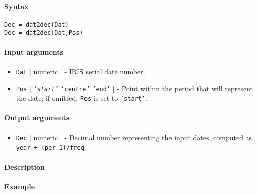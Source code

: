 


	\paragraph{Syntax}\label{syntax}

\begin{verbatim}
Dec = dat2dec(Dat)
Dec = dat2dec(Dat,Pos)
\end{verbatim}

\paragraph{Input arguments}\label{input-arguments}

\begin{itemize}
\item
  \texttt{Dat} {[} numeric {]} - IRIS serial date number.
\item
  \texttt{Pos} {[} \emph{\texttt{'start'}} \textbar{} \texttt{'centre'}
  \textbar{} \texttt{'end'} {]} - Point within the period that will
  represent the date; if omitted, \texttt{Pos} is set to
  \texttt{'start'}.
\end{itemize}

\paragraph{Output arguments}\label{output-arguments}

\begin{itemize}
\itemsep1pt\parskip0pt
\item
  \texttt{Dec} {[} numeric {]} - Decimal number representing the input
  dates, computed as \texttt{year + (per-1)/freq}.
\end{itemize}

\paragraph{Description}\label{description}

\paragraph{Example}\label{example}


